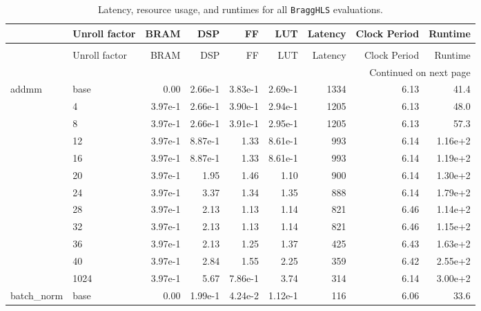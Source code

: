 \begin{longtable}{llrrrrrrr}
\caption{Latency, resource usage, and runtimes for all \texttt{BraggHLS} evaluations.}
\label{tab:all_unrolls}\\
\toprule
 & Unroll factor &       BRAM &      DSP &       FF &      LUT & Latency & Clock Period &  Runtime \\
\midrule
\endfirsthead
\caption[]{Latency, resource usage, and runtimes for all \texttt{BraggHLS} evaluations.} \\
\toprule
& Unroll factor &       BRAM &      DSP &       FF &      LUT & Latency & Clock Period &  Runtime \\
\midrule
\endhead
\midrule
\multicolumn{9}{r}{{Continued on next page}} \\
\midrule
\endfoot

\bottomrule
\endlastfoot
addmm & base &   0.00 & 2.66e-1 & 3.83e-1 & 2.69e-1 &    1334 &     6.13 & 41.4 \\
\cmidrule{2-9}
         & 4    &   3.97e-1 & 2.66e-1 & 3.90e-1 & 2.94e-1 &    1205 &     6.13 & 48.0 \\
\cmidrule{2-9}
         & 8    &   3.97e-1 & 2.66e-1 & 3.91e-1 & 2.95e-1 &    1205 &     6.13 & 57.3 \\
\cmidrule{2-9}
         & 12   &   3.97e-1 & 8.87e-1 & 1.33 & 8.61e-1 &     993 &     6.14 & 1.16e+2 \\
\cmidrule{2-9}
         & 16   &   3.97e-1 & 8.87e-1 & 1.33 & 8.61e-1 &     993 &     6.14 & 1.19e+2 \\
\cmidrule{2-9}
         & 20   &   3.97e-1 & 1.95 & 1.46 & 1.10 &     900 &     6.14 & 1.30e+2 \\
\cmidrule{2-9}
         & 24   &   3.97e-1 & 3.37 & 1.34 & 1.35 &     888 &     6.14 & 1.79e+2 \\
\cmidrule{2-9}
         & 28   &   3.97e-1 & 2.13 & 1.13 & 1.14 &     821 &     6.46 & 1.14e+2 \\
\cmidrule{2-9}
         & 32   &   3.97e-1 & 2.13 & 1.13 & 1.14 &     821 &     6.46 & 1.15e+2 \\
\cmidrule{2-9}
         & 36   &   3.97e-1 & 2.13 & 1.25 & 1.37 &     425 &     6.43 & 1.63e+2 \\
\cmidrule{2-9}
         & 40   &   3.97e-1 & 2.84 & 1.55 & 2.25 &     359 &     6.42 & 2.55e+2 \\
\cmidrule{2-9}
         & 1024 &   3.97e-1 & 5.67 & 7.86e-1 & 3.74 &     314 &     6.14 & 3.00e+2 \\
\midrule
batch\_norm & base &   0.00 & 1.99e-1 & 4.24e-2 & 1.12e-1 &     116 &     6.06 & 33.6 \\

\end{longtable}
